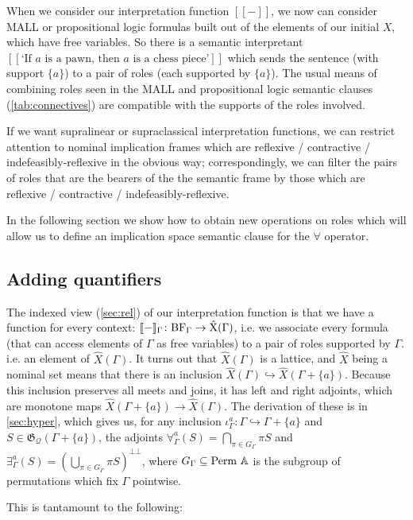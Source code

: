 \documentclass{article}
\theoremstyle{definition}
\newcommand{\A}{\mathbb{A}}
\newcommand{\G}{\mathfrak{G}}
\newcommand{\cQ}{\mathcal{Q}}
\newcommand{\bbrack}[1]{[\![ #1 ]\!]}
\begin{document}
When we consider our interpretation function $\bbrack{-}$, we now can consider MALL or propositional logic formulas built out of the elements of our initial $X$, which have free variables. So there is a semantic interpretant $\bbrack{\text{`If $a$ is a pawn, then $a$ is a chess piece'}}$ which sends the sentence (with support $\{a\}$) to a pair of roles (each supported by $\{a\}$). The usual means of combining roles seen in the MALL and propositional logic semantic clauses (\cref{tab:connectives}) are compatible with the supports of the roles involved.

If we want supralinear or supraclassical interpretation functions, we can restrict attention to nominal implication frames which are reflexive / contractive / indefeasibly-reflexive in the obvious way; correspondingly, we can 
filter the pairs of roles that are the bearers of the the semantic frame by those which are reflexive / contractive / indefeasibly-reflexive. 


In the following section we show how to obtain new operations on roles which will allow us to define an implication space semantic clause for the $\forall$ operator.

\subsection{Adding quantifiers}

The indexed view (\cref{sec:rel}) of our interpretation function is that we have a function for every context: $\bbrack{-}_\Gamma \colon \rm{BF}_\Gamma \to \hat X(\Gamma)$, i.e. we associate every formula (that can access elements of $\Gamma$ as free variables) to a pair of roles supported by $\Gamma$. i.e. an element of $\hat X(\Gamma)$. It turns out that $\hat X(\Gamma)$ is a lattice, and $\hat X$ being a nominal set means that there is an inclusion $\hat X(\Gamma)\hookrightarrow \hat X(\Gamma+\{a\})$. Because this inclusion preserves all meets and joins, it has left and right adjoints, which are monotone maps $\hat X(\Gamma+\{a\})\to \hat X(\Gamma)$. The derivation of these is in \cref{sec:hyper}, which gives us, for any inclusion $\iota^a_\Gamma\colon \Gamma\hookrightarrow \Gamma+\{a\}$ and $S \in \G_\cQ(\Gamma+\{a\})$, the adjoints  $\forall^a_\Gamma(S)=\bigcap_{\pi\in G_\Gamma} \pi S$ and $\exists^a_\Gamma(S) =(\bigcup_{\pi \in G_\Gamma} \pi S)^{\bot\bot}$, where $G_\Gamma \subseteq {\rm Perm\ }\A$ is the subgroup of permutations which fix $\Gamma$ pointwise. 

This is tantamount to the following:
\end{document}
